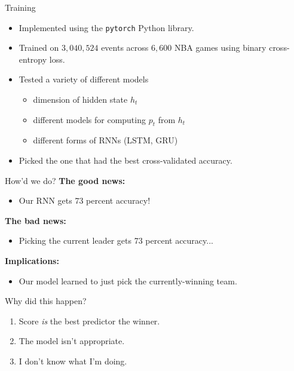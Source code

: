 \begin{frame}{Training}
	\begin{itemize}[<+->]
		\item Implemented using the \texttt{pytorch} Python library.

		      \medskip

		\item Trained on $3,040,524$ events across $6,600$ NBA games using binary cross-entropy loss.

		      \medskip

		\item Tested a variety of different models
		      \begin{itemize}
			      \item dimension of hidden state $h_t$
			      \item different models for computing $p_t$ from $h_t$
			      \item different forms of RNNs (LSTM, GRU)
		      \end{itemize}

		\item Picked the one that had the best cross-validated accuracy.
	\end{itemize}
\end{frame}

\begin{frame}{How'd we do?}
	\textbf{The good news:}
	\begin{itemize}
		\item Our RNN gets 73 percent accuracy!
	\end{itemize}

	\bigskip \pause

	\textbf{The bad news:}
	\begin{itemize}
		\item Picking the current leader gets 73 percent accuracy...
	\end{itemize}

	\bigskip \pause

	\textbf{Implications:}
	\begin{itemize}
		\item Our model learned to just pick the currently-winning team.
	\end{itemize}
\end{frame}

\begin{frame}{Why did this happen?}
	\begin{enumerate}[<+->]
		\item Score \emph{is} the best predictor the winner.
		\item The model isn't appropriate.
		\item I don't know what I'm doing.
	\end{enumerate}
\end{frame}


